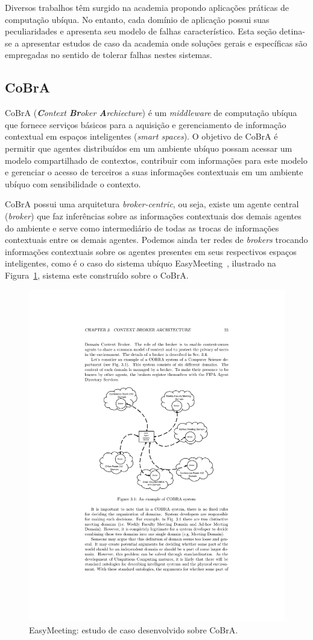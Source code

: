 Diversos trabalhos têm surgido na academia propondo aplicações práticas de computação ubíqua. No entanto, cada domínio de aplicação possui suas peculiaridades e apresenta seu modelo de falhas característico. Esta seção detina-se a apresentar estudos de caso da academia onde soluções gerais e específicas são empregadas no sentido de tolerar falhas nestes sistemas.

\subsection{CoBrA} %
\label{sub:cobra}

CoBrA (\emph{\textbf{C}ontext \textbf{Br}oker \textbf{A}rchiecture}) é um \emph{middleware} de computação ubíqua que fornece serviços básicos para a aquisição e gerenciamento de informação contextual em espaços inteligentes (\emph{smart spaces}). O objetivo de CoBrA é permitir que agentes distribuídos em um ambiente ubíquo possam acessar um modelo compartilhado de contextos, contribuir com informações para este modelo e gerenciar o acesso de terceiros a suas informações contextuais em um ambiente ubíquo com sensibilidade o contexto.

CoBrA possui uma arquitetura \emph{broker-centric}, ou seja, existe um agente central (\emph{broker}) que faz inferências sobre as informações contextuais dos demais agentes do ambiente e serve como intermediário de todas as trocas de informações contextuais entre os demais agentes. Podemos ainda ter redes de \emph{brokers} trocando informações contextuais sobre os agentes presentes em seus respectivos espaços inteligentes, como é o caso do sistema ubíquo EasyMeeting~\cite{finin2005semantic}, ilustrado na Figura~\ref{fig:_cobra_easy_meeting}, sistema este construído sobre o CoBrA.

\begin{figure}[htbp]
	\centering
		\includegraphics[width=.7\textwidth]{figuras/cobra_easy_meeting.pdf}
	\caption{EasyMeeting: estudo de caso desenvolvido sobre CoBrA.}
	\label{fig:_cobra_easy_meeting}
\end{figure}

